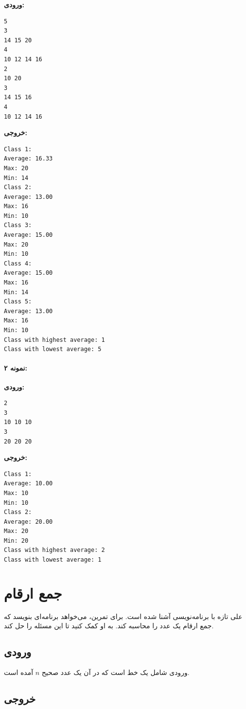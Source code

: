 \documentclass{article}
\begin{document}
\textbf{ورودی:}
\begin{LTR}
\begin{verbatim}
5
3
14 15 20
4
10 12 14 16
2
10 20
3
14 15 16
4
10 12 14 16
\end{verbatim}
\end{LTR}

\textbf{خروجی:}
\begin{LTR}
\begin{verbatim}
Class 1:
Average: 16.33
Max: 20
Min: 14
Class 2:
Average: 13.00
Max: 16
Min: 10
Class 3:
Average: 15.00
Max: 20
Min: 10
Class 4:
Average: 15.00
Max: 16
Min: 14
Class 5:
Average: 13.00
Max: 16
Min: 10
Class with highest average: 1
Class with lowest average: 5
\end{verbatim}
\end{LTR}

\paragraph{نمونه ۲:}

\textbf{ورودی:}
\begin{LTR}
\begin{verbatim}
2
3
10 10 10
3
20 20 20
\end{verbatim}
\end{LTR}

\textbf{خروجی:}
\begin{LTR}
\begin{verbatim}
Class 1:
Average: 10.00
Max: 10
Min: 10
Class 2:
Average: 20.00
Max: 20
Min: 20
Class with highest average: 2
Class with lowest average: 1
\end{verbatim}
\end{LTR}

\newpage

\section{جمع ارقام}

علی تازه با برنامه‌نویسی آشنا شده است. برای تمرین، می‌خواهد برنامه‌ای بنویسد که جمع ارقام یک عدد را محاسبه کند. به او کمک کنید تا این مسئله را حل کند.

\subsection{ورودی}

ورودی شامل یک خط است که در آن یک عدد صحیح \( n \) آمده است.

\subsection{خروجی}
\end{document}
